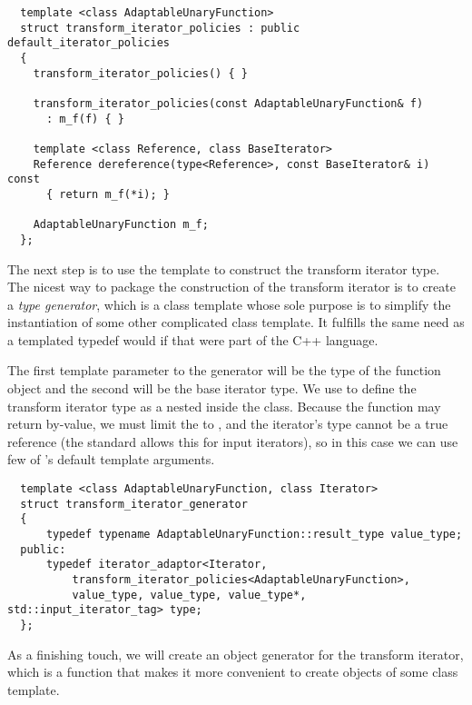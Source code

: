 \documentclass{netobjectdays}
\begin{document}
{\footnotesize
\begin{verbatim}
  template <class AdaptableUnaryFunction>
  struct transform_iterator_policies : public default_iterator_policies
  {
    transform_iterator_policies() { }

    transform_iterator_policies(const AdaptableUnaryFunction& f)
      : m_f(f) { }

    template <class Reference, class BaseIterator>
    Reference dereference(type<Reference>, const BaseIterator& i) const
      { return m_f(*i); }

    AdaptableUnaryFunction m_f;
  };
\end{verbatim}
}

The next step is to use the  template to
construct the transform iterator type. The nicest way to package the
construction of the transform iterator is to create a \emph{type
generator}, which is a class template whose sole purpose is to
simplify the instantiation of some other complicated class
template. It fulfills the same need as a templated typedef would if
that were part of the {C++} language.

The first template parameter to the generator will be the type of the
function object and the second will be the base iterator type. We use
 to define the transform iterator type as a
nested  inside the
 class.  Because the function may
return by-value, we must limit the  to 
, and the iterator's  type cannot be a
true reference (the standard allows this for input iterators), so in
this case we can use few of 's default template
arguments.

{\footnotesize
\begin{verbatim}
  template <class AdaptableUnaryFunction, class Iterator>
  struct transform_iterator_generator
  {
      typedef typename AdaptableUnaryFunction::result_type value_type;
  public:
      typedef iterator_adaptor<Iterator, 
          transform_iterator_policies<AdaptableUnaryFunction>,
          value_type, value_type, value_type*, std::input_iterator_tag> type;
  };
\end{verbatim}
}

As a finishing touch, we will create an 
\textsf{object generator} for the transform iterator, which
 is a function that makes it more convenient to create objects of some
class template.
\end{document}

